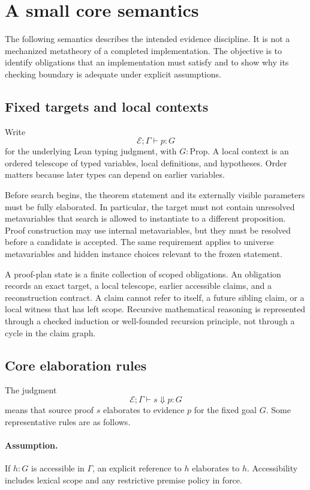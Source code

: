\documentclass[11pt,a4paper]{article}
\newcommand{\Env}{\mathcal E}
\theoremstyle{remark}
\begin{document}
\section{A small core semantics}\label{sec:semantics}

The following semantics describes the intended evidence discipline. It is not a mechanized metatheory of a completed implementation. The objective is to identify obligations that an implementation must satisfy and to show why its checking boundary is adequate under explicit assumptions.

\subsection{Fixed targets and local contexts}

Write
\[
 \Env;\Gamma\vdash p:G
\]
for the underlying Lean typing judgment, with \(G:\mathrm{Prop}\). A local context is an ordered telescope of typed variables, local definitions, and hypotheses. Order matters because later types can depend on earlier variables.

Before search begins, the theorem statement and its externally visible parameters must be fully elaborated. In particular, the target must not contain unresolved metavariables that search is allowed to instantiate to a different proposition. Proof construction may use internal metavariables, but they must be resolved before a candidate is accepted. The same requirement applies to universe metavariables and hidden instance choices relevant to the frozen statement.

A proof-plan state is a finite collection of scoped obligations. An obligation records an exact target, a local telescope, earlier accessible claims, and a reconstruction contract. A claim cannot refer to itself, a future sibling claim, or a local witness that has left scope. Recursive mathematical reasoning is represented through a checked induction or well-founded recursion principle, not through a cycle in the claim graph.

\subsection{Core elaboration rules}

The judgment
\[
 \Env;\Gamma\vdash s\Downarrow p:G
\]
means that source proof \(s\) elaborates to evidence \(p\) for the fixed goal \(G\). Some representative rules are as follows.

\paragraph{Assumption.} If \(h:G\) is accessible in \(\Gamma\), an explicit reference to \(h\) elaborates to \(h\). Accessibility includes lexical scope and any restrictive premise policy in force.
\end{document}
